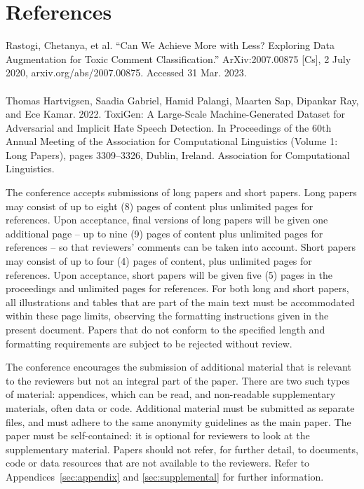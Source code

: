 \documentclass[11pt,a4paper]{article}
\begin{document}
\section*{References}
Rastogi, Chetanya, et al. “Can We Achieve More with Less? Exploring Data Augmentation for Toxic Comment Classification.” ArXiv:2007.00875 [Cs], 2 July 2020, arxiv.org/abs/2007.00875. Accessed 31 Mar. 2023.\\\\
Thomas Hartvigsen, Saadia Gabriel, Hamid Palangi, Maarten Sap, Dipankar Ray, and Ece Kamar. 2022. ToxiGen: A Large-Scale Machine-Generated Dataset for Adversarial and Implicit Hate Speech Detection. In Proceedings of the 60th Annual Meeting of the Association for Computational Linguistics (Volume 1: Long Papers), pages 3309–3326, Dublin, Ireland. Association for Computational Linguistics.



\label{sec:length}

The conference accepts submissions of long papers and short papers.
Long papers may consist of up to eight (8) pages of content plus unlimited pages for references.
Upon acceptance, final versions of long papers will be given one additional page -- up to nine (9) pages of content plus unlimited pages for references -- so that reviewers' comments can be taken into account.
Short papers may consist of up to four (4) pages of content, plus unlimited pages for references.
Upon acceptance, short papers will be given five (5) pages in the proceedings and unlimited pages for references. 
For both long and short papers, all illustrations and tables that are part of the main text must be accommodated within these page limits, observing the formatting instructions given in the present document.
Papers that do not conform to the specified length and formatting requirements are subject to be rejected without review.

The conference encourages the submission of additional material that is relevant to the reviewers but not an integral part of the paper.
There are two such types of material: appendices, which can be read, and non-readable supplementary materials, often data or code.
Additional material must be submitted as separate files, and must adhere to the same anonymity guidelines as the main paper.
The paper must be self-contained: it is optional for reviewers to look at the supplementary material.
Papers should not refer, for further detail, to documents, code or data resources that are not available to the reviewers.
Refer to Appendices~\ref{sec:appendix} and \ref{sec:supplemental} for further information. 
\end{document}
